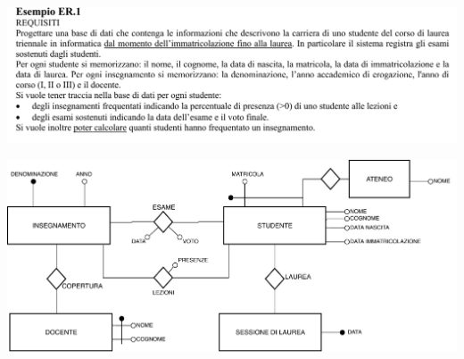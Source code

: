 \documentclass[a4paper, 10pt]{report}
\begin{document}
\newpage

\begin{center}
\includegraphics[scale=1]{esercizio.pdf}
\end{center}

\begin{center}
\includegraphics[scale=0.7]{14ottobre01.pdf}
\end{center}
\end{document}
